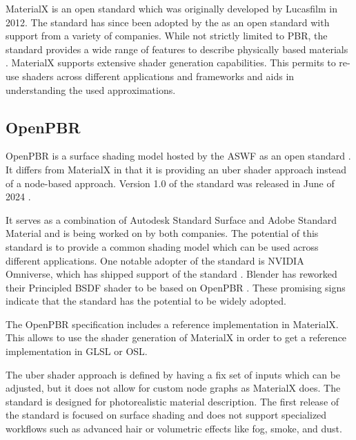 \gls{MaterialX} is an open standard which was originally developed by Lucasfilm in 2012. The standard has since been adopted by the  as an open standard with support from a variety of companies. While not strictly limited to \gls{PBR}, the standard provides a wide range of features to describe physically based materials \cite{Harrysson2019}. \gls{MaterialX} supports extensive shader generation capabilities. This permits to re-use shaders across different applications and frameworks and aids in understanding the used approximations.

\subsection{OpenPBR}

\gls{OpenPBR} is a surface shading model hosted by the \gls{ASWF} as an open standard \cite{openPBRSpec}. It differs from \gls{MaterialX} in that it is providing an \gls{uber shader} approach instead of a node-based approach. Version 1.0 of the standard was released in June of 2024 \cite{openPBR1Dot0Release}.

It serves as a combination of Autodesk Standard Surface and Adobe Standard Material and is being worked on by both companies. The potential of this standard is to provide a common shading model which can be used across different applications. One notable adopter of the standard is NVIDIA Omniverse, which has shipped support of the standard \cite{omniverseOpenPBR}. \gls{Blender} has reworked their Principled BSDF shader to be based on \gls{OpenPBR} \cite{blenderOpenPBRInspiration}. These promising signs indicate that the standard has the potential to be widely adopted.

The \gls{OpenPBR} specification includes a reference implementation in \gls{MaterialX}. This allows to use the shader generation of \gls{MaterialX} in order to get a reference implementation in \gls{GLSL} or \gls{OSL}.

The \gls{uber shader} approach is defined by having a fix set of inputs which can be adjusted, but it does not allow for custom node graphs as \gls{MaterialX} does. The standard is designed for photorealistic material description. The first release of the standard is focused on surface shading and does not support specialized workflows such as advanced hair or volumetric effects like fog, smoke, and dust.

